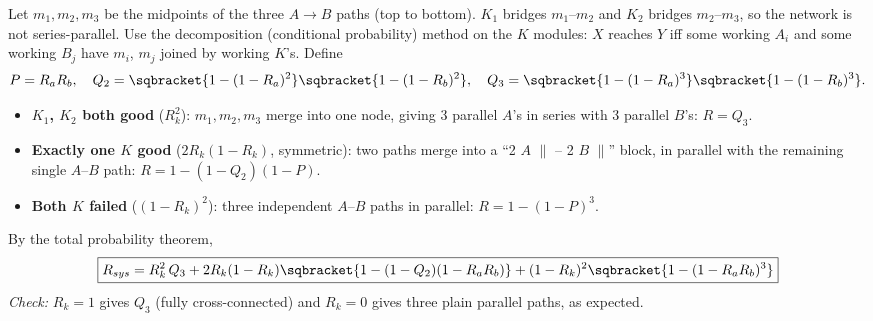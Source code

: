 \documentclass[a4paper, 10pt]{article}
\begin{document}
\begin{problem}
\begin{center}
\end{center}
\end{problem}

\begin{solution}
	Let $m_1,m_2,m_3$ be the midpoints of the three $A \to B$ paths (top to
	bottom). $K_1$ bridges $m_1$--$m_2$ and $K_2$ bridges $m_2$--$m_3$, so
	the network is not series-parallel. Use the decomposition (conditional
	probability) method on the $K$ modules: $X$ reaches $Y$ iff some working
	$A_i$ and some working $B_j$ have $m_i$, $m_j$ joined by working $K$'s.
	Define
	\[
		P = R_aR_b, \quad
		Q_2 = \sqbracket{1-(1-R_a)^2}\sqbracket{1-(1-R_b)^2}, \quad
		Q_3 = \sqbracket{1-(1-R_a)^3}\sqbracket{1-(1-R_b)^3}.
	\]

	\begin{itemize}
		\item \textbf{$K_1$, $K_2$ both good} ($R_k^2$): $m_1,m_2,m_3$ merge into
		      one node, giving 3 parallel $A$'s in series with 3 parallel
		      $B$'s: $R = Q_3$.
		\item \textbf{Exactly one $K$ good} ($2R_k(1-R_k)$, symmetric): two
		      paths merge into a ``2 $A$ $\parallel$ -- 2 $B$ $\parallel$''
		      block, in parallel with the remaining single $A$--$B$ path:
		      $R = 1-(1-Q_2)(1-P)$.
		\item \textbf{Both $K$ failed} ($(1-R_k)^2$): three independent
		      $A$--$B$ paths in parallel: $R = 1-(1-P)^3$.
	\end{itemize}

	By the total probability theorem,
	\[
		\boxed{
			R_{sys} = R_k^2\,Q_3
			+ 2R_k(1-R_k)\sqbracket{1-(1-Q_2)(1-R_aR_b)}
			+ (1-R_k)^2\sqbracket{1-(1-R_aR_b)^3}
		}
	\]
	\textit{Check:} $R_k=1$ gives $Q_3$ (fully cross-connected) and $R_k=0$
	gives three plain parallel paths, as expected.
\end{solution}
\end{document}
